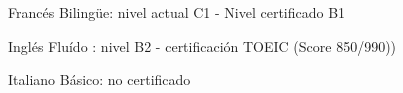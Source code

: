 

\begin{cvskills}
	\cvskill
	{Francés} %
	{Biling\"{u}e: nivel actual C1 - Nivel certificado B1} %
	

	\cvskill
	{Inglés} %
	{Fluído : nivel B2 - certificación TOEIC (Score 850/990))} %
	
	\cvskill
	{Italiano} %
	{Básico: no certificado} %
\end{cvskills}

%
%


